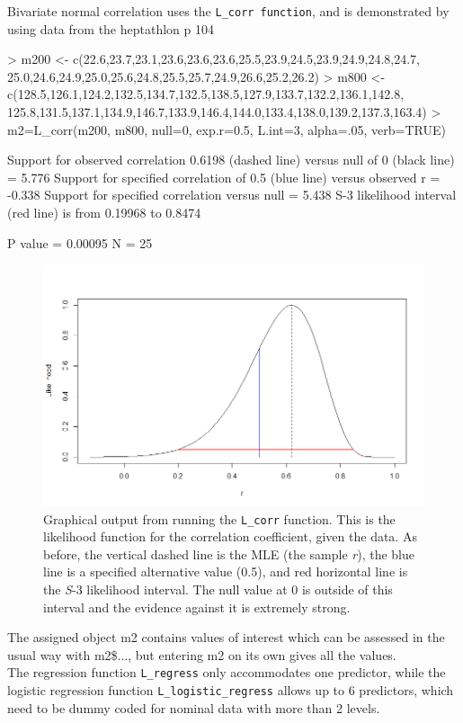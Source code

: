Bivariate normal correlation uses the \texttt{L\_corr function}, and is demonstrated by using data from the heptathlon \citep{Cahusac:2020} p 104\\
\begin{example}
> m200 <- c(22.6,23.7,23.1,23.6,23.6,23.6,25.5,23.9,24.5,23.9,24.9,24.8,24.7,
          25.0,24.6,24.9,25.0,25.6,24.8,25.5,25.7,24.9,26.6,25.2,26.2)
> m800 <- c(128.5,126.1,124.2,132.5,134.7,132.5,138.5,127.9,133.7,132.2,136.1,142.8,
          125.8,131.5,137.1,134.9,146.7,133.9,146.4,144.0,133.4,138.0,139.2,137.3,163.4)
> m2=L_corr(m200, m800, null=0, exp.r=0.5, L.int=3, alpha=.05, verb=TRUE)

Support for observed correlation 0.6198 (dashed line) versus null of 0 (black line) = 5.776
 Support for specified correlation of 0.5 (blue line) versus observed r = -0.338
 Support for specified correlation versus null = 5.438
 S-3 likelihood interval (red line) is from 0.19968 to 0.8474

 P value = 0.00095 
 N = 25
\end{example}
\begin{figure}[htbp]
\centering
\includegraphics[width=12cm,
  keepaspectratio,]{figure3}
\caption{Graphical output from running the \texttt{L\_corr} function. This is the likelihood function for the correlation coefficient, given the data. As before, the vertical dashed line is the MLE (the sample \emph{r}), the blue line is a specified alternative value (0.5), and red horizontal line is the \emph{S}-3 likelihood interval. The null value at 0 is outside of this interval and the evidence against it is extremely strong. }
\label{figure:figure3}
\end{figure}
\pagebreak
The assigned object m2 contains values of interest which can be assessed in the usual way with m2\$..., but entering m2 on its own gives all the values.\\
The regression function \texttt{L\_regress} only accommodates one predictor, while the logistic regression function \texttt{L\_logistic\_regress} allows up to 6 predictors, which need to be dummy coded for nominal data with more than 2 levels.

